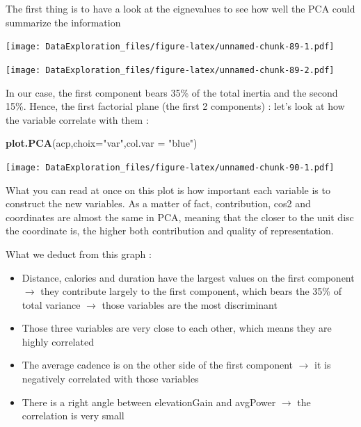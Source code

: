 \documentclass[
]{book}
\newenvironment{Shaded}{\begin{snugshade}}{\end{snugshade}}
\newcommand{\DataTypeTok}[1]{\textcolor[rgb]{0.13,0.29,0.53}{#1}}
\newcommand{\DecValTok}[1]{\textcolor[rgb]{0.00,0.00,0.81}{#1}}
\newcommand{\KeywordTok}[1]{\textcolor[rgb]{0.13,0.29,0.53}{\textbf{#1}}}
\newcommand{\NormalTok}[1]{#1}
\newcommand{\OperatorTok}[1]{\textcolor[rgb]{0.81,0.36,0.00}{\textbf{#1}}}
\newcommand{\StringTok}[1]{\textcolor[rgb]{0.31,0.60,0.02}{#1}}
\providecommand{\tightlist}{%
  \setlength{\itemsep}{0pt}\setlength{\parskip}{0pt}}
\begin{document}
The first thing is to have a look at the eignevalues to see how well the PCA could summarize the information

\begin{Shaded}
\end{Shaded}

\texttt{[image: DataExploration\_files/figure-latex/unnamed-chunk-89-1.pdf]}

\begin{Shaded}
\end{Shaded}

\texttt{[image: DataExploration\_files/figure-latex/unnamed-chunk-89-2.pdf]}

In our case, the first component bears 35\% of the total inertia and the second 15\%. Hence, the first factorial plane (the first 2 components) : let's look at how the variable correlate with them :

\begin{Shaded}
\begin{Highlighting}[]
\KeywordTok{plot.PCA}\NormalTok{(acp,}\DataTypeTok{choix=}\StringTok{"var"}\NormalTok{,}\DataTypeTok{col.var =} \StringTok{"blue"}\NormalTok{)}
\end{Highlighting}
\end{Shaded}

\texttt{[image: DataExploration\_files/figure-latex/unnamed-chunk-90-1.pdf]}

What you can read at once on this plot is how important each variable is to construct the new variables. As a matter of fact, contribution, cos2 and coordinates are almost the same in PCA, meaning that the closer to the unit disc the coordinate is, the higher both contribution and quality of representation.

What we deduct from this graph :

\begin{itemize}
\tightlist
\item
  Distance, calories and duration have the largest values on the first component \(\rightarrow\) they contribute largely to the first component, which bears the 35\% of total variance \(\rightarrow\) those variables are the most discriminant
\item
  Those three variables are very close to each other, which means they are highly correlated
\item
  The average cadence is on the other side of the first component \(\rightarrow\) it is negatively correlated with those variables
\item
  There is a right angle between elevationGain and avgPower \(\rightarrow\) the correlation is very small
\end{itemize}
\end{document}
